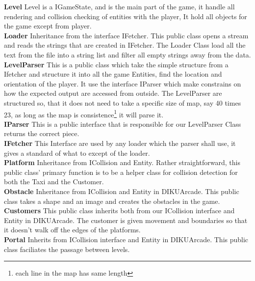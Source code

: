 \documentclass[../master.tex]{subfile}
\begin{document}
\textbf{Level}
Level is a IGameState, and is the main part of the game, it handle all rendering and collision checking of entities with the player, It hold all objects for the game except from player.\\

\textbf{Loader}
Inheritance from the interface IFetcher. This public class opens a stream and reads the strings that are created in IFetcher. The Loader Class load all the text from the file into a string list and filter all empty strings away from the data.\\

\textbf{LevelParser}
This is a public class which take the simple structure from a Ifetcher and structure it into all the game Entities, find the location and orientation of the player. It use the interface IParser which make constrains on how the expected output are accessed from outside. The LevelParser are structured so, that it does not need to take a specific size of map, say 40 times 23, as long as the map is consistence\footnote{each line in the map has same length} it will parse it.\\

\textbf{IParser}
This is a public interface that is responsible for our LevelParser Class returns the correct piece.\\

\textbf{IFetcher}
This Interface are used by any loader which the parser shall use, it gives a standard of what to except of the loader.\\

\textbf{Platform}
Inheritance from ICollision and Entity. Rather straightforward, this public class' primary function is to be a helper class for collision detection for both the Taxi and the Customer.\\

\textbf{Obstacle} 
Inheritance from ICollision and Entity in DIKUArcade. This public class takes a shape and an image and creates the obstacles in the game.\\

\textbf{Customers}
This public class inherits both from our ICollision interface and Entity in DIKUArcade. The customer is given movement and boundaries so that it doesn't walk off the edges of the platforms.\\

\textbf{Portal}
Inherits from ICollision interface and Entity in DIKUArcade. This public class faciliates the passage between levels.
\end{document}
